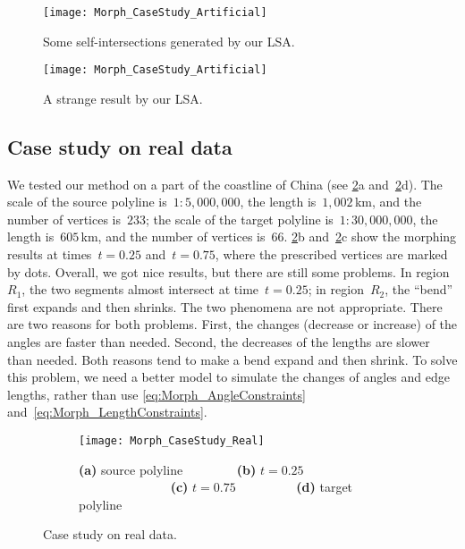 \begin{figure}[tb]
	\centering	
	\texttt{[image: Morph\_CaseStudy\_Artificial]}
	\caption{Some self-intersections generated by our LSA.}
	\label{fig:Morph_DataComplex}
\par\vspace{\intextsep} %
	\centering	
	\texttt{[image: Morph\_CaseStudy\_Artificial]}
	\caption{A strange result by our LSA.}
	\label{fig:Morph_ExtraVertices}
\end{figure}

\subsection{Case study on real data}
\label{sec:Morph_CaseStudy}

We tested our method on a part of the coastline of China 
(see \figs\ref{fig:Morph_RealData}a 
and~\ref{fig:Morph_RealData}d). 
The scale of the source polyline is~$1:5{,}000{,}000$,
the length is~$1{,}002\,$km, 
and the number of vertices is~$233$; 
the scale of the target polyline is~$1:30{,}000{,}000$, 
the length is~$605\,$km, 
and the number of vertices is~$66$. 
%
\figs\ref{fig:Morph_RealData}b and~\ref{fig:Morph_RealData}c
show the morphing results
at times~$t = 0.25$ and~$t = 0.75$,
where the prescribed vertices are marked by dots. 
Overall, we got nice results, 
but there are still some problems. 
In region~$R_{1}$, the two segments almost 
intersect at time~$t = 0.25$; 
in region~$R_{2}$, 
the ``bend'' first expands and then shrinks. 
The two phenomena are not appropriate. 
There are two reasons for both problems. 
First, the changes (decrease or increase) of the angles 
are faster than needed. 
Second, the decreases of the lengths are slower than needed. 
Both reasons tend to make a bend expand and then shrink. 
To solve this problem, we need a better model to 
simulate the changes of angles and edge lengths,
rather than use \eqs\ref{eq:Morph_AngleConstraints}
and~\ref{eq:Morph_LengthConstraints}.

\begin{figure}[tb]
	\captionsetup[subfigure]
	{justification=centering,font=normalsize}
	\begin{subfigure}[b]{\textwidth}
		\centering
		\texttt{[image: Morph\_CaseStudy\_Real]}
		\caption{
			\textbf{(a)} source polyline~~~~~~~~
			\textbf{(b)} $t=0.25$~~~~~~~~~~~~~~
			\textbf{(c)} $t=0.75$~~~~~~~~~
			\textbf{(d)} target polyline}
	\end{subfigure}
	\caption{Case study on real data.}
	\label{fig:Morph_RealData}
\end{figure}


